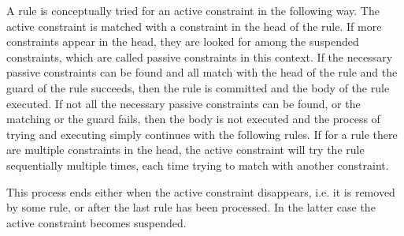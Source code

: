 \documentclass[thesis-solanki.tex]{subfiles}
\begin{document}
A rule is conceptually tried for an active constraint in the following way. The active constraint is matched with a constraint in the head of the rule. If more constraints appear in the head, they are looked for among the suspended constraints, which are called passive constraints in this context. If the necessary passive constraints can be found and all match with the head of the rule and the guard of the rule succeeds, then the rule is committed and the body of the rule executed. If not all the necessary passive constraints can be found, or the matching or the guard fails, then the body is not executed and the process of trying and executing simply continues with the following rules. If for a rule there are multiple constraints in the head, the active constraint will try the rule sequentially multiple times, each time trying to match with another constraint.

This process ends either when the active constraint disappears, i.e. it is removed by some rule, or after the last rule has been processed. In the latter case the active constraint becomes suspended.
\end{document}
